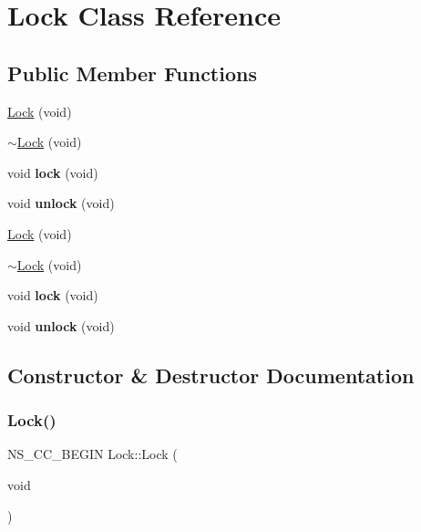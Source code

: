 \hypertarget{classLock}{}\section{Lock Class Reference}
\label{classLock}
\subsection*{Public Member Functions}
\begin{DoxyCompactItemize}
\item 
\hyperlink{classLock_a104e3a531aeb29737496c628f9ff59dd}{Lock} (void)
\item 
\hyperlink{classLock_ab1bf86c77a1c172f96d3076992e0a23b}{$\sim$\+Lock} (void)
\item 
\mbox{\label{classLock_a6cbbad1f48fbaf6729e679e08992f800}} 
void {\bfseries lock} (void)
\item 
\mbox{\label{classLock_a3f3ea264402518f840c01223d4b94a3a}} 
void {\bfseries unlock} (void)
\item 
\hyperlink{classLock_a75e46c7992bbadf39c5d21f078c5a996}{Lock} (void)
\item 
\hyperlink{classLock_ab1bf86c77a1c172f96d3076992e0a23b}{$\sim$\+Lock} (void)
\item 
\mbox{\label{classLock_a6cbbad1f48fbaf6729e679e08992f800}} 
void {\bfseries lock} (void)
\item 
\mbox{\label{classLock_a3f3ea264402518f840c01223d4b94a3a}} 
void {\bfseries unlock} (void)
\end{DoxyCompactItemize}


\subsection{Constructor \& Destructor Documentation}
\mbox{\label{classLock_a104e3a531aeb29737496c628f9ff59dd}} 
\subsubsection{\texorpdfstring{Lock()}{Lock()}\hspace{0.1cm}{\footnotesize\ttfamily [1/2]}}
{\footnotesize\ttfamily N\+S\+\_\+\+C\+C\+\_\+\+B\+E\+G\+IN Lock\+::\+Lock (\begin{DoxyParamCaption}\item[{void}]{ }\end{DoxyParamCaption})}


